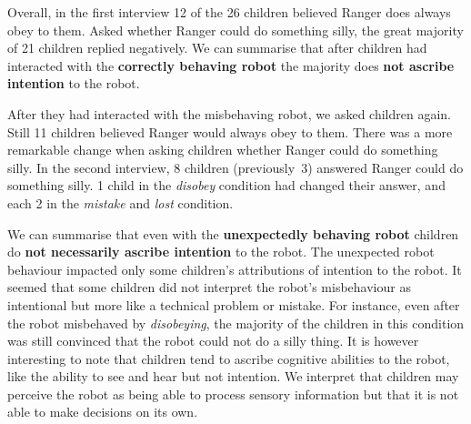 \documentclass[letterpaper, 10pt, conference]{ieeeconf}
\begin{document}
Overall, in the first interview 12 of the 26 children believed Ranger does
always obey to them. Asked whether Ranger could do something silly, the great
majority of 21 children replied negatively. We can summarise that after children
had interacted with the \textbf{correctly behaving robot} the majority does
\textbf{not ascribe intention} to the robot.

After they had interacted with the misbehaving robot, we asked children again.
Still 11 children believed Ranger would always obey to them. There was a
more remarkable change when asking children whether Ranger could do something
silly. In the second interview, 8 children (previously~3) answered Ranger could
do something silly. 1 child in the \textit{disobey} condition had changed their
answer, and each 2 in the \textit{mistake} and \textit{lost} condition. 

We can summarise that even with the \textbf{unexpectedly behaving robot}
children do \textbf{not necessarily ascribe intention} to the robot. The
unexpected robot behaviour impacted only some children's attributions of
intention to the robot.  It seemed that some children did not interpret the
robot's misbehaviour as intentional but more like a technical problem or
mistake. For instance, even after the robot misbehaved by \textit{disobeying},
the majority of the children in this condition was still convinced that the
robot could not do a silly thing.  It is however interesting to note that children tend
to ascribe cognitive abilities to the robot, like the ability to see and hear
but not intention. We interpret that children may perceive the robot as being
able to process sensory information but that it is not able to make decisions on
its own. 

%
\end{document}
